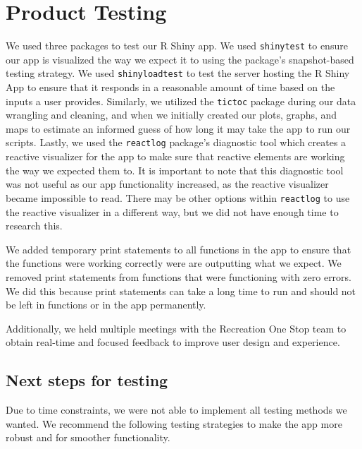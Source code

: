 \documentclass[
]{book}
\begin{document}
\hypertarget{product-testing}{%
\section{Product Testing}\label{product-testing}}

We used three packages to test our R Shiny app. We used \texttt{shinytest} \citep{R-shinytest} to ensure our app is visualized the way we expect it to using the package's snapshot-based testing strategy. We used \texttt{shinyloadtest} \citep{R-shinyloadtest} to test the server hosting the R Shiny App to ensure that it responds in a reasonable amount of time based on the inputs a user provides. Similarly, we utilized the \texttt{tictoc} \citep{R-tictoc} package during our data wrangling and cleaning, and when we initially created our plots, graphs, and maps to estimate an informed guess of how long it may take the app to run our scripts. Lastly, we used the \texttt{reactlog} \citep{R-reactlog} package's diagnostic tool which creates a reactive visualizer for the app to make sure that reactive elements are working the way we expected them to. It is important to note that this diagnostic tool was not useful as our app functionality increased, as the reactive visualizer became impossible to read. There may be other options within \texttt{reactlog} to use the reactive visualizer in a different way, but we did not have enough time to research this.

We added temporary print statements to all functions in the app to ensure that the functions were working correctly were are outputting what we expect. We removed print statements from functions that were functioning with zero errors. We did this because print statements can take a long time to run and should not be left in functions or in the app permanently.

Additionally, we held multiple meetings with the Recreation One Stop team to obtain real-time and focused feedback to improve user design and experience.

\hypertarget{next-steps-for-testing}{%
\subsection{Next steps for testing}\label{next-steps-for-testing}}

Due to time constraints, we were not able to implement all testing methods we wanted. We recommend the following testing strategies to make the app more robust and for smoother functionality.
\end{document}
